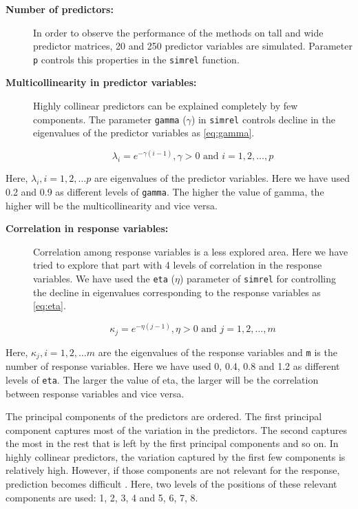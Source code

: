 \documentclass[12pt,3p,authoryear]{elsarticle}
\providecommand{\tightlist}{%
  \setlength{\itemsep}{0pt}\setlength{\parskip}{0pt}}
\begin{document}
\begin{description}
\item[\textbf{Number of predictors:}]
In order to observe the performance of the methods on tall and wide
predictor matrices, 20 and 250 predictor variables are simulated.
Parameter \texttt{p} controls this properties in the \texttt{simrel}
function.
\item[\textbf{Multicollinearity in predictor variables:}]
Highly collinear predictors can be explained completely by few
components. The parameter \texttt{gamma} (\(\gamma\)) in \texttt{simrel}
controls decline in the eigenvalues of the predictor variables as
\eqref{eq:gamma}.

\begin{equation}
  \lambda_i = e^{-\gamma(i - 1)}, \gamma > 0 \text{ and } i = 1, 2, \ldots, p
  \label{eq:gamma}
\end{equation}
\end{description}

Here, \(\lambda_i, i = 1, 2, \ldots p\) are eigenvalues of the predictor
variables. Here we have used 0.2 and 0.9 as different levels of
\texttt{gamma}. The higher the value of gamma, the higher will be the
multicollinearity and vice versa.

\begin{description}
\item[\textbf{Correlation in response variables:}]
Correlation among response variables is a less explored area. Here we
have tried to explore that part with 4 levels of correlation in the
response variables. We have used the \texttt{eta} (\(\eta\)) parameter
of \texttt{simrel} for controlling the decline in eigenvalues
corresponding to the response variables as \eqref{eq:eta}.

\begin{equation}
  \kappa_j = e^{-\eta(j - 1)}, \eta > 0 \text{ and } j = 1, 2, \ldots, m
  \label{eq:eta}
\end{equation}
\end{description}

Here, \(\kappa_j, i = 1, 2, \ldots m\) are the eigenvalues of the
response variables and \texttt{m} is the number of response variables.
Here we have used 0, 0.4, 0.8 and 1.2 as different levels of
\texttt{eta}. The larger the value of eta, the larger will be the
correlation between response variables and vice versa.

\begin{description}
\tightlist
\item[\textbf{Position of predictor components relevant to the
response:}]
The principal components of the predictors are ordered. The first
principal component captures most of the variation in the predictors.
The second captures the most in the rest that is left by the first
principal components and so on. In highly collinear predictors, the
variation captured by the first few components is relatively high.
However, if those components are not relevant for the response,
prediction becomes difficult \citep{Helland1994b}. Here, two levels of
the positions of these relevant components are used: 1, 2, 3, 4 and 5,
6, 7, 8.
\end{description}
\end{document}
